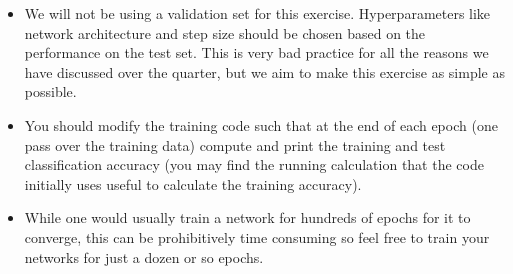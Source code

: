 \documentclass{article}
\newcommand{\1}{\mathbf{1}}
\begin{document}
\begin{itemize}
  \item We will not be using a validation set for this exercise. Hyperparameters like network architecture and step size should be chosen based on the performance on the test set. This is very bad practice for all the reasons we have discussed over the quarter, but we aim to make this exercise as simple as possible.      
  \item You should modify the training code such that at the end of each epoch (one pass over the training data) compute and print the training and test classification accuracy (you may find the running calculation that the code initially uses useful to calculate the training accuracy).
  \item While one would usually train a network for hundreds of epochs for it to converge, this can be prohibitively time consuming so feel free to train your networks for just a dozen or so epochs. 
\end{itemize}
\end{document}

